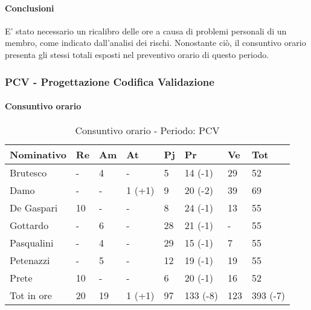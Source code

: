 				\paragraph{Conclusioni}
				E’ stato necessario un ricalibro delle ore a causa di problemi personali di un membro, come indicato
				dall’analisi dei rischi. Nonostante ciò, il consuntivo orario presenta gli stessi totali esposti nel preventivo orario di questo periodo.
\newpage
\subsubsection{PCV - Progettazione Codifica Validazione}
\paragraph{Consuntivo orario}
							\begin{table}[H] \begin{center} \begin{tabular}{llllllll}
										\toprule
										\textbf{Nominativo}	&	\textbf{Re}	&	\textbf{Am}	&	\textbf{At}	&	\textbf{Pj}	&	\textbf{Pr}	&	\textbf{Ve}	&	\textbf{Tot}\\
										\midrule
										Brutesco	&	-		&	4		&	-		&	5		&	14	(-1)&	29	&	52	\\
										Damo		&	-		&	-		&	1	(+1)&	9		&	20	(-2)&	39	&	69	\\
										De Gaspari	&	10		&	-		&	-		&	8		&	24	(-1)&	13	&	55	\\
										Gottardo	&	-		&	6		&	-		&	28		&	21	(-1)&	-	&	55	\\
										Pasqualini	&	-		&	4		&	-		&	29		&	15	(-1)&	7	&	55	\\
										Petenazzi	&	-		&	5		&	-		&	12		&	19	(-1)&	19	&	55	\\
										Prete		&	10		&	-		&	-		&	6		&	20	(-1)&	16	&	52	\\
										\midrule																				
										Tot in ore	&	20		&	19		&	1	(+1)&	97		&	133	(-8)&	123	&	393	(-7)\\
																				
										\bottomrule
									\end{tabular} \end{center} \caption{Consuntivo orario - Periodo:
									PCV
								} \end{table}
